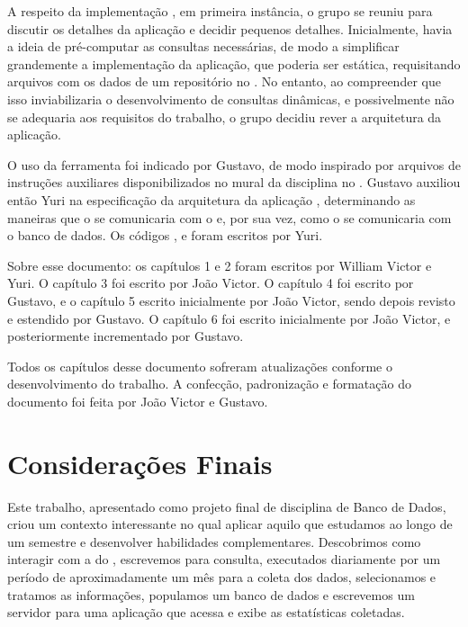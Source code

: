    A respeito da implementação , em primeira instância, o grupo se reuniu para discutir os detalhes da aplicação 
   e decidir pequenos detalhes. Inicialmente, havia a ideia de pré-computar as consultas necessárias, de modo a simplificar
   grandemente a implementação da aplicação, que poderia ser estática, requisitando arquivos  com os dados de um
   repositório no . No entanto, ao compreender que isso inviabilizaria o desenvolvimento de consultas dinâmicas,
   e possivelmente não se adequaria aos requisitos do trabalho, o grupo decidiu rever a arquitetura da aplicação.

   O uso da ferramenta  foi indicado por Gustavo, de modo inspirado por arquivos de instruções auxiliares
   disponibilizados no mural da disciplina no . Gustavo auxiliou então Yuri na especificação da
   arquitetura da aplicação , determinando as maneiras que o  se comunicaria com o
    e, por sua vez, como o  se comunicaria com o banco de dados.
   Os códigos ,  e  foram escritos por Yuri.

    Sobre esse documento: os capítulos 1 e 2 foram escritos por William Victor e Yuri.
    O capítulo 3 foi escrito por João Victor.
    O capítulo 4 foi escrito por Gustavo, e o capítulo 5 escrito inicialmente por João Victor,
    sendo depois revisto e estendido por Gustavo.
    O capítulo 6 foi escrito inicialmente por João Victor, e posteriormente incrementado por Gustavo.

    Todos os capítulos desse documento sofreram atualizações conforme o desenvolvimento do trabalho. A confecção, padronização
    e formatação do documento foi feita por João Victor e Gustavo.

\chapter{Considerações Finais}

   Este trabalho, apresentado como projeto final de disciplina de Banco de Dados, criou um contexto interessante no qual
   aplicar aquilo que estudamos ao longo de um semestre e desenvolver habilidades complementares.
   Descobrimos como interagir com a  do , escrevemos  para consulta, executados diariamente
   por um período de aproximadamente um mês para a coleta dos dados, selecionamos e tratamos as informações,
   populamos um banco de dados  e escrevemos um servidor para uma aplicação  que acessa e exibe
   as estatísticas coletadas.

